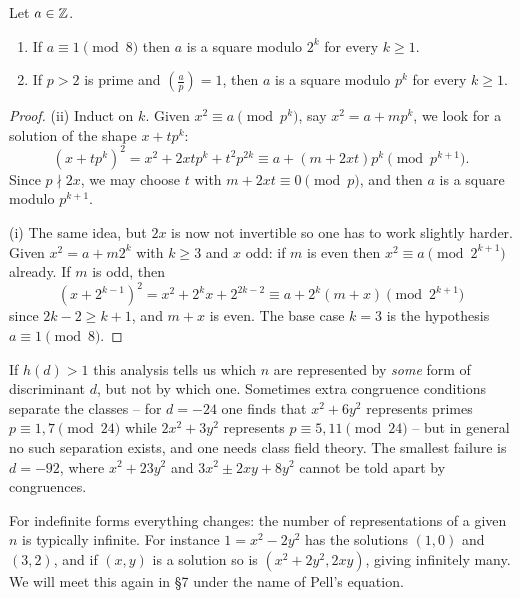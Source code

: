 \documentclass[a4paper]{scrartcl}
\begin{document}
\begin{lemma}\label{lem:lifting}
	Let $a \in \mathbb{Z}$.
	\begin{enumerate}[label=(\roman*)]
		\item If $a \equiv 1 \pmod 8$ then $a$ is a square modulo $2^k$ for every $k \geq 1$.
		\item If $p > 2$ is prime and $\left( \frac ap \right) = 1$, then $a$ is a square modulo $p^k$ for every $k \geq 1$.
	\end{enumerate}
\end{lemma}
\begin{proof}
	(ii) Induct on $k$. Given $x^2 \equiv a \pmod{p^k}$, say $x^2 = a + mp^k$, we look for a solution of the shape $x + tp^k$:
	$$
	(x + tp^k)^2 = x^2 + 2xtp^k + t^2p^{2k} \equiv a + (m + 2xt)p^k \pmod{p^{k+1}}.
	$$
	Since $p \nmid 2x$, we may choose $t$ with $m + 2xt \equiv 0 \pmod p$, and then $a$ is a square modulo $p^{k+1}$.

	(i) The same idea, but $2x$ is now not invertible so one has to work slightly harder. Given $x^2 = a + m2^k$ with $k \geq 3$ and $x$ odd: if $m$ is even then $x^2 \equiv a \pmod{2^{k+1}}$ already. If $m$ is odd, then
	$$
	(x + 2^{k-1})^2 = x^2 + 2^kx + 2^{2k - 2} \equiv a + 2^k(m + x) \pmod{2^{k+1}}
	$$
	since $2k - 2 \geq k+1$, and $m + x$ is even. The base case $k = 3$ is the hypothesis $a \equiv 1 \pmod 8$.
\end{proof}

\begin{remark}
	If $h(d) > 1$ this analysis tells us which $n$ are represented by \emph{some} form of discriminant $d$, but not by which one. Sometimes extra congruence conditions separate the classes -- for $d = -24$ one finds that $x^2 + 6y^2$ represents primes $p \equiv 1, 7 \pmod{24}$ while $2x^2 + 3y^2$ represents $p \equiv 5, 11 \pmod{24}$ -- but in general no such separation exists, and one needs class field theory. The smallest failure is $d = -92$, where $x^2 + 23y^2$ and $3x^2 \pm 2xy + 8y^2$ cannot be told apart by congruences.
\end{remark}

\begin{remark}
	For indefinite forms everything changes: the number of representations of a given $n$ is typically infinite. For instance $1 = x^2 - 2y^2$ has the solutions $(1,0)$ and $(3,2)$, and if $(x,y)$ is a solution so is $(x^2 + 2y^2, 2xy)$, giving infinitely many. We will meet this again in \S7 under the name of Pell's equation.
\end{remark}
\end{document}
